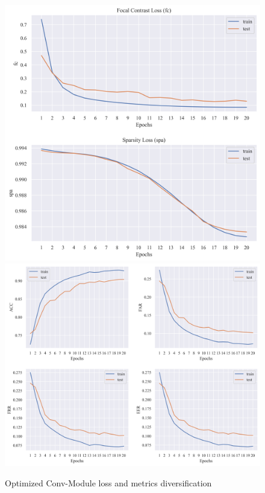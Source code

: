 \begin{figure}[H]
\centering
\includegraphics[scale=0.35]{figure/afloss.png}
\includegraphics[scale=0.34]{figure/afmetrics.png}
\caption{Optimized Conv-Module loss and metrics diversification}
\label{fig:afloss}
\end{figure}

